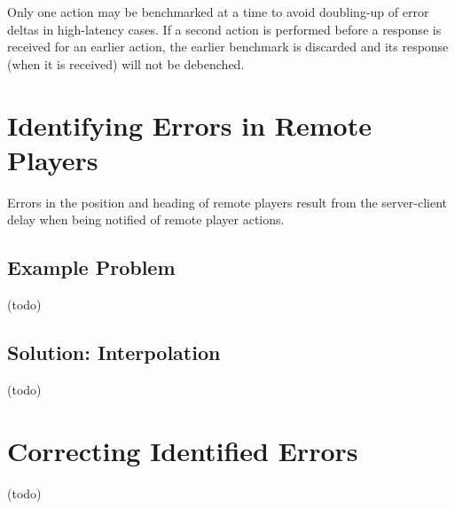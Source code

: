 \documentclass{article}
\begin{document}
Only one action may be benchmarked at a time to avoid doubling-up of error deltas in high-latency cases. If a second action is performed before a response is received for an earlier action, the earlier benchmark is discarded and its response (when it is received) will not be debenched.

\section{Identifying Errors in Remote Players}

Errors in the position and heading of remote players result from the server-client delay when being notified of remote player actions.

\subsection*{Example Problem}

(todo)

\subsection*{Solution: Interpolation}

(todo)

\section{Correcting Identified Errors}

(todo)
\end{document}
